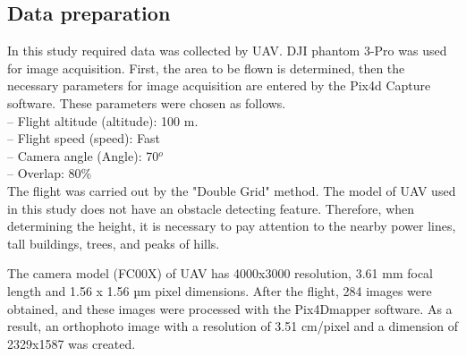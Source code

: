 \documentclass[a4paper,fleqn]{cas-sc}
\begin{document}
\subsection{Data preparation}
In this study required data was collected by UAV. DJI phantom 3-Pro was used for image acquisition. First, the area to be flown is determined, then the necessary parameters for image acquisition are entered by the Pix4d Capture software. These parameters were chosen as follows.\\
– Flight altitude (altitude): 100 m.\\
– Flight speed (speed): Fast\\
– Camera angle (Angle): 70$^o$\\
– Overlap: 80\%\\

The flight was carried out by the "Double Grid" method. The model of UAV used in this study does not have an obstacle detecting feature. Therefore, when determining the height, it is necessary to pay attention to the nearby power lines, tall buildings, trees, and peaks of hills.

The camera model (FC00X) of UAV has 4000x3000 resolution, 3.61 mm focal length and 1.56 x 1.56 µm pixel dimensions. After the flight, 284 images were obtained, and these images were processed with the Pix4Dmapper software. As a result, an orthophoto image with a resolution of 3.51 cm/pixel and a dimension of 2329x1587 was created.
\end{document}
